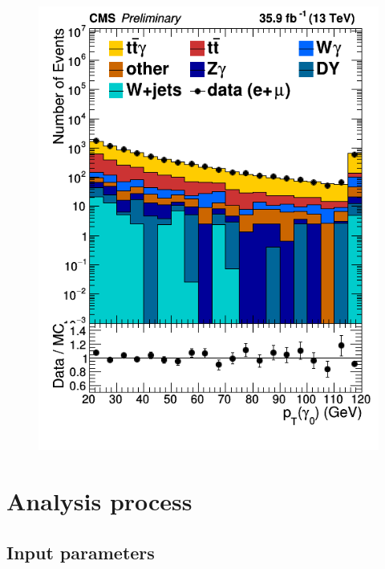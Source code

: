 \documentclass[11pt]{scrartcl}
\begin{document}
\begin{figure}[H]
\begin{minipage}{.5\textwidth}
  \includegraphics[width=1\linewidth]{figures/PhotonGood0_pt_log.png}
  \label{fig:PhotonPTlog}
\end{minipage}
\end{figure}

\section{Analysis process}

	\subsection{Input parameters}
	
\end{document}
